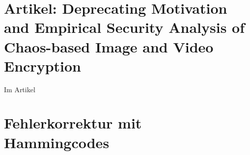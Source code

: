 \section{Artikel: Deprecating Motivation and Empirical Security Analysis of Chaos-based Image and Video Encryption}
Im Artikel \cite{chaos}

\section{Fehlerkorrektur mit Hammingcodes}




